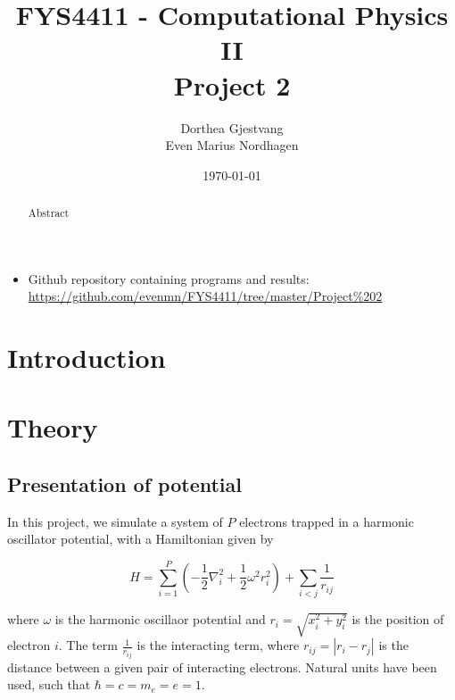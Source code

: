 \documentclass[norsk,a4paper,12pt]{article}
\title{FYS4411 - Computational Physics II\\\vspace{2mm} \Large{Project 2}}
\author{\large Dorthea Gjestvang\\ Even Marius Nordhagen}
\date\today
\begin{document}
\maketitle

\begin{itemize}
\item Github repository containing programs and results: \\\url{https://github.com/evenmn/FYS4411/tree/master/Project%202}
\end{itemize}

\begin{abstract}
Abstract
\par 

\end{abstract}

\newpage

\tableofcontents

\newpage

\section{Introduction} \label{sec:Introduction}


\section{Theory} \label{sec:Theory}
\subsection{Presentation of potential} \label{sec:Presentation_of_potential}
In this project, we simulate a system of $P$ electrons trapped in a harmonic oscillator potential, with a Hamiltonian given by

\begin{equation}
\label{eq:Hamiltonian}
\hat{H} = \sum_{i=1}^{P} (-\frac{1}{2} \nabla_i^2 + \frac{1}{2} \omega^2 r_i ^2) + \sum_{i<j} \frac{1}{r_{ij}} 
\end{equation}

where $\omega$ is the harmonic oscillaor potential and  $r_i = \sqrt{x_i^2 + y_i^2}$ is the position of electron $i$. The term $\frac{1}{r_{ij}}$ is the interacting term, where $r_{ij} = |r_i - r_j|$ is the distance between a given pair of interacting electrons. Natural units have been used, such that $\hbar = c = m_e = e = 1$.
\end{document}
